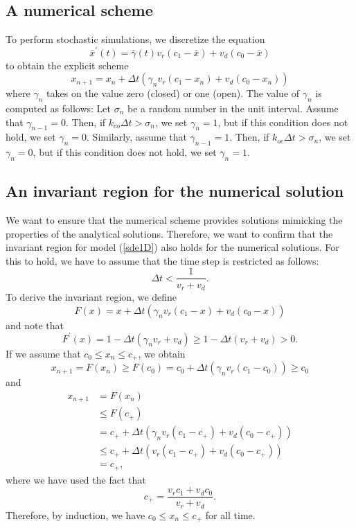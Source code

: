 \subsection{A numerical scheme}
\label{numscheme}

To perform stochastic simulations, we discretize the equation
\begin{equation}
\bar{x}^{\prime}(t)=\bar{\gamma}(t)v_{r}(c_{1}-\bar{x})+v_{d}(c_{0}-\bar{x}) \label{sde1D}
\end{equation}
to obtain the explicit scheme
\begin{equation}
x_{n+1}=x_{n}+\Delta t\left( \gamma_{n}v_{r}(c_{1}-x_{n})+v_{d}(c_{0}
-x_{n})\right) \label{sde1D_scheme}
\end{equation}
where $\gamma_{n}$ takes on the value zero (closed) or one (open). The value of $\gamma_{n}$ is computed as follows: Let $\sigma_n$ be a random number in the unit interval. Assume that $\gamma_{n-1}=0$. Then, if $k_{co}\Delta t >\sigma_n$, we set 
$\gamma_{n}=1$, but if this condition does not hold, we set $\gamma_{n}=0$. Similarly, assume that $\gamma_{n-1}=1$. Then, if $k_{oc}\Delta t >\sigma_n$, we set 
$\gamma_{n}=0$, but if this condition does not hold, we set $\gamma_{n}=1$.

\subsection{An invariant region for the numerical solution}
We want to ensure that the numerical scheme provides solutions mimicking the properties of the analytical solutions. Therefore, we want to confirm that the invariant region for model (\ref{sde1D}) also holds for the numerical solutions. For this to hold, we have to assume that the time step is restricted as follows:
\begin{equation}
\Delta t<\frac{1}{v_{r}+v_{d}}. \label{time_step_sode}
\end{equation}
To derive the invariant region, we define
\[
F(x)=x+\Delta t\left(  \gamma_{n}v_{r}(c_{1}-x)+v_{d}(c_{0}-x)\right)
\]
and note that
\[
F^{\prime}(x)=1-\Delta t\left(  \gamma_{n}v_{r}+v_{d}\right)  \geqslant
1-\Delta t\left(  v_{r}+v_{d}\right)  >0.
\]
If we assume that $c_{0}\leqslant x_{n}\leqslant c_{+}$, we obtain
\[
x_{n+1}=F(x_{n})\geqslant F(c_{0})=c_{0}+\Delta t\left(  \gamma_{n}v_{r}
(c_{1}-c_{0})\right)  \geqslant c_{0}
\]
and
\begin{align*}
x_{n+1}  &  =F(x_{n})\\
&\leqslant F(c_{+})\\
&  =c_{+}+\Delta t\left(  \gamma_{n}v_{r}(c_{1}-c_{+})+v_{d}(c_{0}
-c_{+})\right) \\
&  \leqslant c_{+}+\Delta t\left(  v_{r}(c_{1}-c_{+})+v_{d}(c_{0}
-c_{+})\right) \\
&  =c_{+},
\end{align*}
where we have used the fact that
\[ c_{+}=\frac{v_{r}c_{1}+v_{d}c_{0}}{v_{r}+v_{d}}.\]
Therefore, by induction, we have $c_{0}\leqslant x_{n}\leqslant c_{+}$ for all time.


